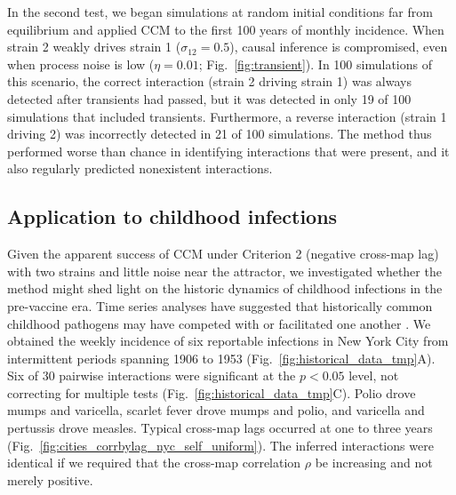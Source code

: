 In the second test, we began simulations at random initial conditions far from equilibrium and applied CCM to the first 100 years of monthly incidence.
When strain 2 weakly drives strain 1 ($\sigma_{12}=0.5$), causal inference is compromised, even when process noise is low ($\eta=0.01$; Fig.~\ref{fig:transient}).
In 100 simulations of this scenario, the correct interaction (strain 2 driving strain 1) was always detected after transients had passed, but it was detected in only 19 of 100 simulations that included transients.
Furthermore, a reverse interaction (strain 1 driving 2) was incorrectly detected in 21 of 100 simulations.
The method thus performed worse than chance in identifying interactions that were present, and it also regularly predicted nonexistent interactions.

\subsection*{Application to childhood infections}

Given the apparent success of CCM under Criterion 2 (negative cross-map lag) with two strains and little noise near the attractor, we investigated whether the method might shed light on the historic dynamics of childhood infections in the pre-vaccine era.
Time series analyses have suggested that historically common childhood pathogens may have competed with or facilitated one another \cite{Mina2015, Rohani2003}.
We obtained the weekly incidence of six reportable infections in New York City from intermittent periods spanning 1906 to 1953 \cite{vanPanhuis2013} (Fig.~\ref{fig:historical_data_tmp}A).
Six of 30 pairwise interactions were significant at the $p<0.05$ level, not correcting for multiple tests (Fig.~\ref{fig:historical_data_tmp}C).
Polio drove mumps and varicella, scarlet fever drove mumps and polio, and varicella and pertussis drove measles. 
Typical cross-map lags occurred at one to three years (Fig.~\ref{fig:cities_corrbylag_nyc_self_uniform}).
The inferred interactions were identical if we required that the cross-map correlation $\rho$ be increasing and not merely positive.

